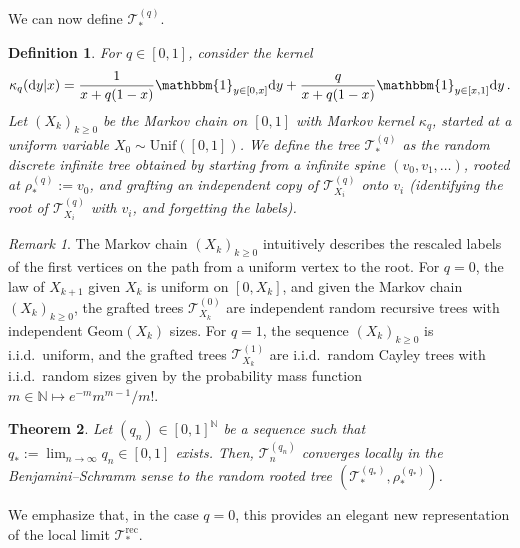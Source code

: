 \documentclass{article}
\newtheorem{theorem}{Theorem}[section]
\newtheorem{definition}[theorem]{Definition}
\theoremstyle{remark}
\newtheorem{remark}{Remark}
\newcommand{\bN}{\mathbb{N}}
\newcommand{\cT}{\mathcal{T}}
\newcommand{\One}[1]{\mathbbm{1}_{#1}}
\newcommand{\Unif}[1]{\mathrm{Unif}{\left(#1\right)}}
\newcommand{\rec}{\mathrm{rec}}
\begin{document}
We can now define $\cT_*^{(q)}$.

\begin{definition}%
\label{def:t etoile q}
    For $q \in [0,1]$, consider the kernel 
    \[
        \kappa_q(\mathrm dy|x)=\frac{1}{x+q(1-x)} \mathbbm{1}_{y \in [0,x]} \mathrm dy + \frac{q}{x+q(1-x)} \mathbbm{1}_{y \in [x,1]} \mathrm dy \,.
    \]
    Let $(X_k)_{k \geq 0}$ be the Markov chain on $[0,1]$ with Markov kernel $\kappa_q$, started at a uniform variable $X_0 \sim \Unif{[0,1]}$. 
    We define the tree $\cT_*^{(q)}$ as the random discrete infinite tree obtained by starting from a infinite spine $(v_0,v_1,\ldots)$, rooted at $\rho_*^{(q)} := v_0$, and grafting an independent copy of $\cT_{X_i}^{(q)}$ onto $v_i$ (identifying the root of $\cT_{X_i}^{(q)}$ with $v_i$, and forgetting the labels). 
\end{definition}

\begin{remark}
\label{rk:kernels}
    The Markov chain $(X_k)_{k\ge0}$ intuitively describes the rescaled labels of the first vertices on the path from a uniform vertex to the root.
    For $q=0$, 
    the law of $X_{k+1}$ given $X_k$ is uniform on $[0,X_k]$, and given the Markov chain $(X_k)_{k\ge0}$, the grafted trees $\cT_{X_k}^{(0)}$ are independent random recursive trees with independent $\mathrm{Geom}(X_k)$ sizes.
    For $q=1$, the sequence $(X_k)_{k\ge0}$ is i.i.d.~uniform,
    and the grafted trees $\cT_{X_k}^{(1)}$ are i.i.d.\ random Cayley trees with i.i.d.\ random sizes given by the probability mass function $m\in\bN \mapsto e^{-m} m^{m-1} / m!$.
\end{remark}

\begin{theorem}\label{th: BS local limit unified}
    Let $(q_n) \in [0,1]^\bN$ be a sequence such that $q_* := \lim_{n \to \infty} q_n \in [0,1]$ exists.
    Then, $\cT_n^{(q_n)}$ converges locally in the Benjamini--Schramm sense to the random rooted tree $(\cT_*^{(q_*)},\rho_*^{(q_*)})$.
\end{theorem}

We emphasize that, in the case $q=0$, this provides an elegant new representation of the local limit $\cT_*^{\rec}$.
\end{document}
